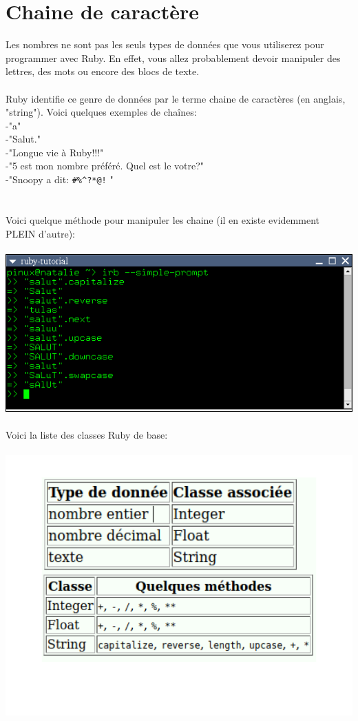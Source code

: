 \documentclass[a4paper,12pt,openany]{book}
\begin{document}

\section{Chaine de caractère}

Les nombres ne sont pas les seuls types de données que vous utiliserez pour programmer avec Ruby. En effet, vous allez probablement devoir manipuler des lettres, des mots ou encore des blocs de texte.\\
\\
Ruby identifie ce genre de données par le terme chaine de caractères (en anglais, "string"). Voici quelques exemples de chaînes:\\
-"a"\\
-"Salut."\\
-"Longue vie à Ruby!!!"\\
-"5 est mon nombre préféré. Quel est le votre?"\\
-"Snoopy a dit: \verb:#%^?*@!: "\\
\\
\\
Voici quelque méthode pour manipuler les chaine (il en existe evidemment PLEIN d'autre):\\
\\
\includegraphics[width=1\linewidth,center]{img/methode-chaine.png}\\
\\
Voici la liste des classes Ruby de base:\\
\\
\includegraphics[width=1\linewidth,center]{img/classe-methode-debase.png}\\
\end{document}
